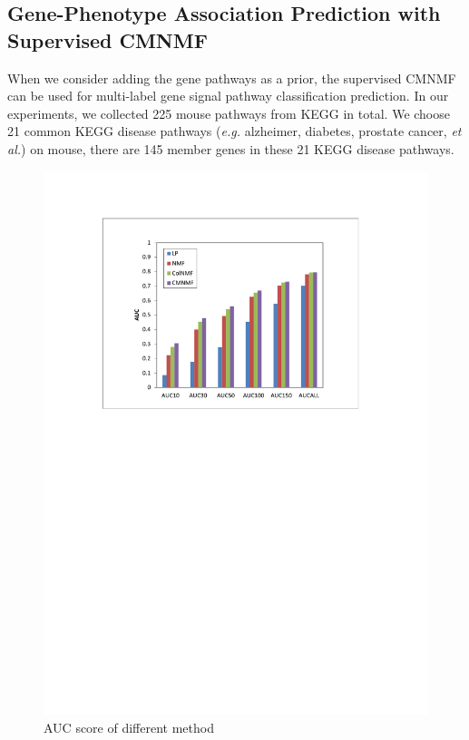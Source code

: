 \documentclass{bmcart}
\begin{document}
\subsection*{\textbf{Gene-Phenotype Association Prediction with Supervised CMNMF}}
 When we consider adding the gene pathways as a prior, the supervised CMNMF can be used for multi-label gene signal pathway classification prediction. In our experiments, we collected 225 mouse pathways from KEGG in total. We choose 21 common KEGG disease pathways (\emph{e.g.} alzheimer, diabetes, prostate cancer, \emph{et al.}) on mouse, there are 145 member genes in these 21 KEGG disease pathways.
\begin{figure}[!h]
  \begin{minipage}[t]{0.6\linewidth}
    \includegraphics[width=\linewidth,origin = l]{DrawPictures/auc_excel.pdf}
  \end{minipage}
  \caption{AUC score of different method} \label{fig:AUC}
\end{figure}
\end{document}
